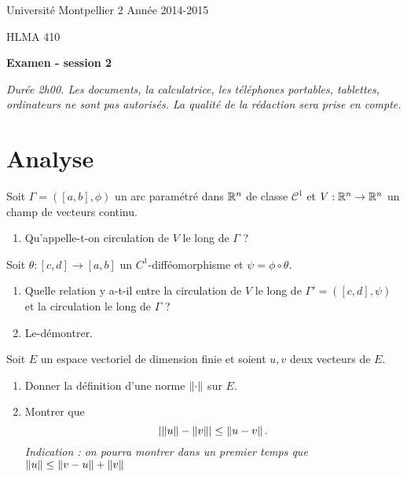 \documentclass{article}
\begin{document}
\noindent Université Montpellier 2 \hfill Année 2014-2015

\noindent HLMA 410
 


\bigskip

\begin{center}
{\large \sffamily\bfseries Examen - session 2}
\end{center}

\textit{Durée 2h00. Les documents, la calculatrice, les téléphones portables, tablettes, ordinateurs ne sont pas autorisés. La qualité de la rédaction sera prise en compte.} 

\bigskip
\bigskip

\section{Analyse}

	Soit $\Gamma=([a,b],\phi)$ un arc param\'etr\'e dans $\mathbb{R}^n$ de classe $\mathcal C^1$ et $V:\mathbb{R}^n \rightarrow \mathbb{R}^n$ un champ de vecteurs continu.
\begin{enumerate}
	\item Qu'appelle-t-on circulation de $V$ le long de $\Gamma$ ?
\end{enumerate}
			Soit $\theta: [c,d] \rightarrow [a,b]$ un $C^1$-diff\'eomorphisme et $\psi=\phi \circ \theta$. 
		\begin{enumerate}[resume]
	\item Quelle relation y a-t-il entre la circulation de $V$ le long de $\Gamma'=([c,d],\psi)$ et la circulation le long de $\Gamma$ ? 	\item Le-d\'emontrer.
\end{enumerate}

\bigskip


Soit $E$ un espace vectoriel de dimension finie et soient $u,v$ deux vecteurs de $E$. 
\begin{enumerate}
\item Donner la définition d'une norme $\left\lVert\cdot\right\rVert$ sur $E$.
\item Montrer que 	
	\[
		\left\lvert \left\lVert u\right\rVert - \left\lVert v\right\rVert \right\rvert \leq \left\lVert u-v\right\rVert.
	\]
	{\itshape Indication : on pourra montrer dans un premier temps que $\left\lVert u\right\rVert \leq \left\lVert v-u\right\rVert + \left\lVert v\right\rVert$}
\end{enumerate}

\bigskip

\end{document}
